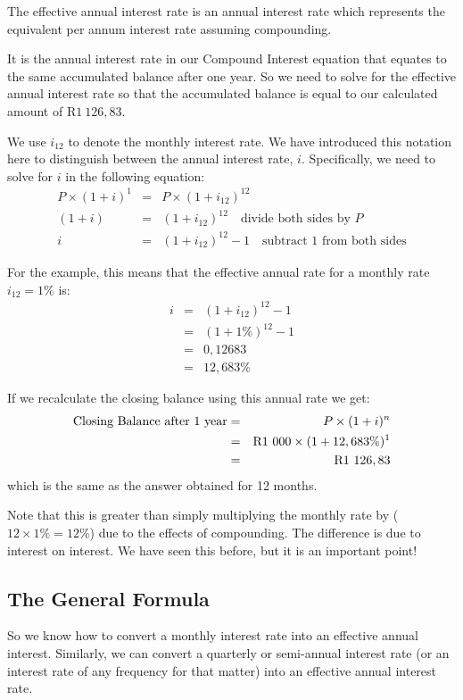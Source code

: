The effective annual interest rate is an annual interest rate which represents the equivalent per annum interest rate assuming compounding.

It is the annual interest rate in our Compound Interest equation that equates to the same accumulated balance after one year. So we need to solve for the effective annual interest rate so that the accumulated balance is equal to our calculated amount of R$1~126,83$.

We use $i_{12}$ to denote the monthly interest rate. We have introduced this notation here to distinguish between the annual interest rate, $i$. Specifically, we need to solve for $i$ in the following equation:
\begin{eqnarray*}
P\times (1 + i) ^1 &=& P\times (1 + i_{12})^{12}\\
(1 + i) &=& (1 + i_{12})^{12}\quad\mbox{divide both sides by $P$}\\
i &=& (1 + i_{12})^{12}-1\quad\mbox{subtract $1$ from both sides}
\end{eqnarray*}

For the example, this means that the effective annual rate for a monthly rate $i_{12}=1\%$ is:
\begin{eqnarray*}
i &=& (1 + i_{12})^{12}-1\\
&=& (1 + 1\%)^{12}-1\\
&=&0,12683\\
&=&12,683\%
\end{eqnarray*}

If we recalculate the closing balance using this annual rate we get:
\begin{eqnarray*}
\mbox{Closing Balance after 1 year}&=& P \times (1 + i)^n \\
&=& \rm{R}1~000 \times (1 + 12,683\%)^{1} \\
&=& \rm{R}1~126,83
\end{eqnarray*}
which is the same as the answer obtained for 12 months.

Note that this is greater than simply multiplying the monthly rate by ($12 \times 1\% = 12\%$) due to the effects of compounding. The difference is due to interest on interest. We have seen this before, but it is an important point!

\subsection{The General Formula}
So we know how to convert a monthly interest rate into an effective annual interest. Similarly, we can convert a quarterly or semi-annual interest rate (or an interest rate of any frequency for that matter) into an effective annual interest rate.

